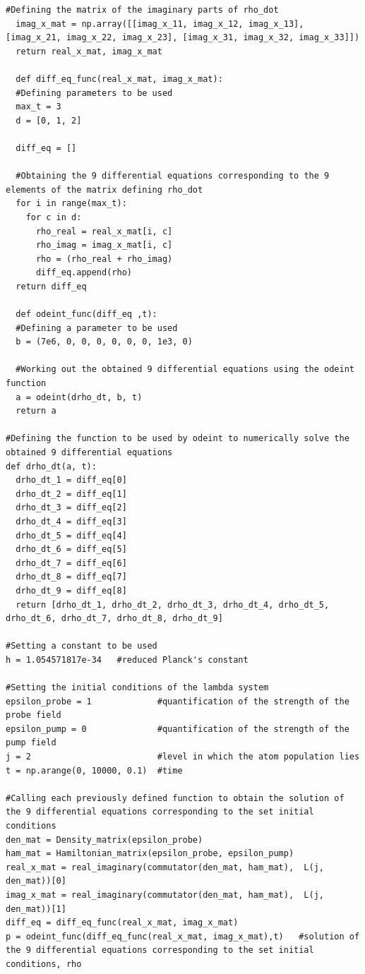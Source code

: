 \documentclass[12pt, a4paper]{article}
\begin{document}
\begin{lstlisting}[language=iPython]
  #Defining the matrix of the imaginary parts of rho_dot
  imag_x_mat = np.array([[imag_x_11, imag_x_12, imag_x_13], [imag_x_21, imag_x_22, imag_x_23], [imag_x_31, imag_x_32, imag_x_33]])
  return real_x_mat, imag_x_mat

  def diff_eq_func(real_x_mat, imag_x_mat):
  #Defining parameters to be used
  max_t = 3
  d = [0, 1, 2]

  diff_eq = []

  #Obtaining the 9 differential equations corresponding to the 9 elements of the matrix defining rho_dot
  for i in range(max_t):
    for c in d:
      rho_real = real_x_mat[i, c]
      rho_imag = imag_x_mat[i, c]
      rho = (rho_real + rho_imag)
      diff_eq.append(rho)
  return diff_eq

  def odeint_func(diff_eq ,t):
  #Defining a parameter to be used
  b = (7e6, 0, 0, 0, 0, 0, 0, 1e3, 0)

  #Working out the obtained 9 differential equations using the odeint function
  a = odeint(drho_dt, b, t)
  return a

#Defining the function to be used by odeint to numerically solve the obtained 9 differential equations
def drho_dt(a, t):
  drho_dt_1 = diff_eq[0]
  drho_dt_2 = diff_eq[1]
  drho_dt_3 = diff_eq[2]
  drho_dt_4 = diff_eq[3]
  drho_dt_5 = diff_eq[4]
  drho_dt_6 = diff_eq[5]
  drho_dt_7 = diff_eq[6]
  drho_dt_8 = diff_eq[7]
  drho_dt_9 = diff_eq[8]
  return [drho_dt_1, drho_dt_2, drho_dt_3, drho_dt_4, drho_dt_5, drho_dt_6, drho_dt_7, drho_dt_8, drho_dt_9]

#Setting a constant to be used
h = 1.054571817e-34   #reduced Planck's constant

#Setting the initial conditions of the lambda system
epsilon_probe = 1             #quantification of the strength of the probe field
epsilon_pump = 0              #quantification of the strength of the pump field
j = 2                         #level in which the atom population lies
t = np.arange(0, 10000, 0.1)  #time

#Calling each previously defined function to obtain the solution of the 9 differential equations corresponding to the set initial conditions
den_mat = Density_matrix(epsilon_probe)
ham_mat = Hamiltonian_matrix(epsilon_probe, epsilon_pump)
real_x_mat = real_imaginary(commutator(den_mat, ham_mat),  L(j, den_mat))[0]
imag_x_mat = real_imaginary(commutator(den_mat, ham_mat),  L(j, den_mat))[1]
diff_eq = diff_eq_func(real_x_mat, imag_x_mat)
p = odeint_func(diff_eq_func(real_x_mat, imag_x_mat),t)   #solution of the 9 differential equations corresponding to the set initial conditions, rho


\end{lstlisting}
\end{document}
